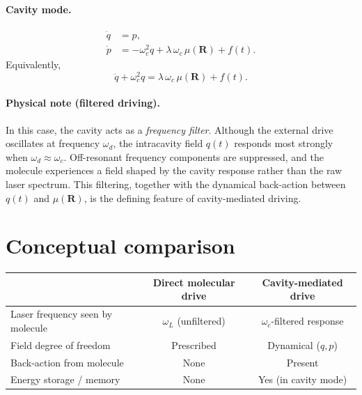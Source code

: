\documentclass[11pt]{article}
\begin{document}
\paragraph{Cavity mode.}
\begin{align}
\dot q &= p,\\
\dot p &= -\omega_c^2 q + \lambda\,\omega_c\,\mu(\bm R) + f(t).
\end{align}
Equivalently,
\begin{equation}
\ddot q + \omega_c^2 q = \lambda\,\omega_c\,\mu(\bm R) + f(t).
\end{equation}

\paragraph{Physical note (filtered driving).}
In this case, the cavity acts as a \emph{frequency filter}.
Although the external drive oscillates at frequency $\omega_d$,
the intracavity field $q(t)$ responds most strongly when
$\omega_d \approx \omega_c$.
Off-resonant frequency components are suppressed, and the molecule
experiences a field shaped by the cavity response rather than the
raw laser spectrum.
This filtering, together with the dynamical back-action
between $q(t)$ and $\mu(\bm R)$, is the defining feature of cavity-mediated
driving.

\section{Conceptual comparison}

\begin{center}
\begin{tabular}{lcc}
\hline
 & Direct molecular drive & Cavity-mediated drive \\
\hline
Laser frequency seen by molecule & $\omega_L$ (unfiltered) & $\omega_c$-filtered response \\
Field degree of freedom & Prescribed & Dynamical ($q,p$) \\
Back-action from molecule & None & Present \\
Energy storage / memory & None & Yes (in cavity mode) \\
\hline
\end{tabular}
\end{center}
\end{document}
